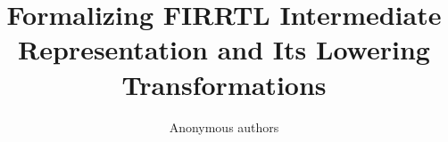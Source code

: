 \documentclass[acmsmall,review,anonymous]{acmart}%
\begin{document}
\title{Formalizing FIRRTL Intermediate Representation and Its Lowering Transformations}




\author{Anonymous authors}
\end{document}
